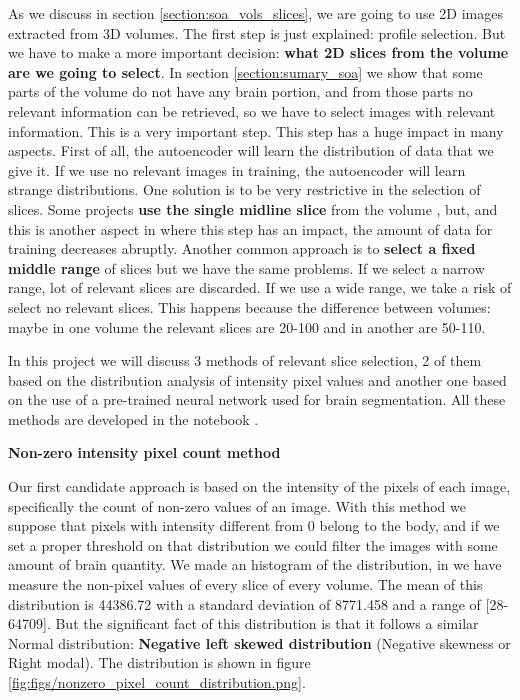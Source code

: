 As we discuss in section \ref{section:soa_vols_slices}, we are going to use 2D images extracted from 3D volumes. The first step is just explained: profile selection. But we have to make a more important decision: \textbf{what 2D slices from the volume are we going to select}. In section \ref{section:sumary_soa} we show that some parts of the volume do not have any brain portion, and from those parts no relevant information can be retrieved, so we have to select images with relevant information. This is a very important step. This step has a huge impact in many aspects. First of all, the autoencoder will learn the distribution of data that we give it. If we use no relevant images in training, the autoencoder will learn strange distributions. One solution is to be very restrictive in the selection of slices. Some projects \textbf{use the single midline slice} from the volume \cite{bermudez2018t1autoencoder}, but, and this is another aspect in where this step has an impact, the amount of data for training decreases abruptly. Another common approach is to \textbf{select a fixed middle range} of slices but we have the same problems. If we select a narrow range, lot of relevant slices are discarded. If we use a wide range, we take a risk of select no relevant slices. This happens because the difference between volumes: maybe in one volume the relevant slices are 20-100 and in another are 50-110.

In this project we will discuss 3 methods of relevant slice selection, 2 of them based on the distribution analysis of intensity pixel values and another one based on the use of a pre-trained neural network used for brain segmentation. All these methods are developed in the notebook .

\textbf{Non-zero intensity pixel count method}

Our first candidate approach is based on the intensity of the pixels of each image, specifically the count of non-zero values of an image. With this method we suppose that pixels with intensity different from 0 belong to the body, and if we set a proper threshold on that distribution we could filter the images with some amount of brain quantity. We made an histogram of the distribution, in we have measure the non-pixel values of every slice of every volume. The mean of this distribution is 44386.72 with a standard deviation of 8771.458 and a range of [28-64709]. But the significant fact of this distribution is that it follows a similar Normal distribution: \textbf{Negative left skewed distribution} (Negative skewness or Right modal). The distribution is shown in figure \ref{fig:figs/nonzero_pixel_count_distribution.png}. 

